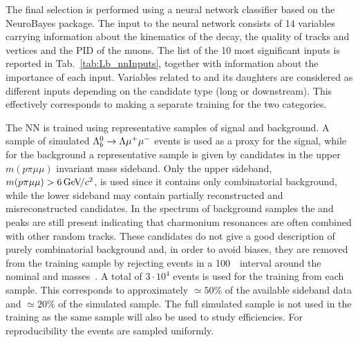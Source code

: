 The final selection is performed using a neural network classifier based on the NeuroBayes package.
 The input to the neural network consists of 14 variables carrying 
information about the kinematics of the decay, the quality of tracks and vertices and the PID of the muons.
The list of the 10 most significant inputs is reported in Tab.~\ref{tab:Lb_nnInputs}, together with information 
about the importance of each input.
%
%
%
Variables related to \Lz and its daughters are considered as different inputs depending on the
candidate type (long or downstream). This effectively corresponds to making a separate
training for the two categories. 

The NN is trained using representative samples of signal and background.  A sample of simulated 
${{\Lambda}^0_{b}}\rightarrow{\ensuremath{\Lambda}}{\ensuremath{\mu^+\mu^-}}$ events is used as a proxy for the signal, while for the background a representative sample
is given by candidates in the upper $m(p\pi\mu\mu)$ invariant mass sideband. Only the upper sideband,
$m(p\pi\mu\mu) > 6 \gevcc$, is used since it contains only combinatorial background,
while the lower sideband may contain partially reconstructed and misreconstructed candidates.
In the \qsq spectrum of background samples the \jpsi and \psitwos peaks are still present indicating that charmonium
resonances are often combined with other random tracks. These candidates do not give a good description of purely
combinatorial background and, in order to avoid biases, they are removed from the training
sample by rejecting events in a 100~\mevcc~interval around the nominal \jpsi and \psitwos masses~\cite{PDG2014}.
A total of $3\cdot10^4$ events is used for the training from each sample. This corresponds to approximately
$\simeq 50\%$ of the available sideband data and $\simeq 20\%$ of the simulated sample. The full simulated sample 
is not used in the training as the same sample will also be used to study efficiencies. For reproducibility 
the events are sampled uniformly.


